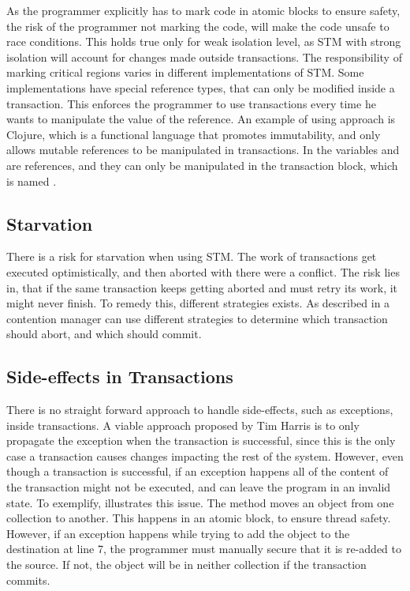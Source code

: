As the programmer explicitly has to mark code in atomic blocks to ensure safety, the risk of the programmer not marking the code, will make the code unsafe to race conditions. This holds true only for weak isolation level, as \ac{STM} with strong isolation will account for changes made outside transactions. The responsibility of marking critical regions varies in different implementations of \ac{STM}. Some implementations have special reference types, that can only be modified inside a transaction. This enforces the programmer to use transactions every time he wants to manipulate the value of the reference. An example of using approach is Clojure, which is a functional language that promotes immutability, and only allows mutable references to be manipulated in transactions. In  the variables  and  are references, and they can only be manipulated in the transaction block, which is named .

\subsection{Starvation}
There is a risk for starvation when using \ac{STM}. The work of transactions get executed optimistically, and then aborted with there were a conflict. The risk lies in, that if the same transaction keeps getting aborted and must retry its work, it might never finish. To remedy this, different strategies exists. As described in  a contention manager can use different strategies to determine which transaction should abort, and which should commit. 

\subsection{Side-effects in Transactions}
There is no straight forward approach to handle side-effects, such as exceptions, inside transactions. A viable approach proposed by Tim Harris\cite{harris2005exceptions} is to only propagate the exception when the transaction is successful, since this is the only case a transaction causes changes impacting the rest of the system. However, even though a transaction is successful, if an exception happens all of the content of the transaction might not be executed, and can leave the program in an invalid state. To exemplify,  illustrates this issue. The method  moves an object from one collection to another. This happens in an atomic block, to ensure thread safety. However, if an exception happens while trying to add the object to the destination at line 7, the programmer must manually secure that it is re-added to the source. If not, the object will be in neither collection if the transaction commits. 

